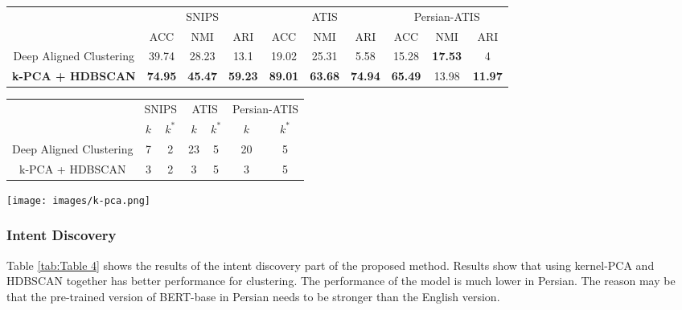 \documentclass{article}
\begin{document}
\begin{table*}
	\centering
	\caption{Results of evaluating the proposed method for Intent Discovery (clustering)}
	\label{tab:Table 4}
	\begin{tabular}{cccccccccc}
	  \toprule
	  & \multicolumn{3}{c}{SNIPS} & \multicolumn{3}{c}{ATIS} & \multicolumn{3}{c}{Persian-ATIS} \\
	  & ACC & NMI & ARI & ACC & NMI & ARI & ACC & NMI & ARI \\ \hline
	  \midrule
	  Deep Aligned Clustering & 39.74 & 28.23 & 13.1 & 19.02 & 25.31 & 5.58 & 15.28 & \textbf{17.53} & 4 \\ \hline
	  \textbf{k-PCA + HDBSCAN} & \textbf{74.95} & \textbf{45.47} & \textbf{59.23} & \textbf{89.01} & \textbf{63.68} & \textbf{74.94} & \textbf{65.49} & 13.98 & \textbf{11.97}\\ \hline
\end{tabular}
  \end{table*}
  \begin{table*}
	\centering
	\caption{The ability of methods to find different available intents in OOD utterances}
	\label{tab:Table 5}
	\begin{tabular}{ccccccc}
	  \toprule
	  & \multicolumn{2}{c}{SNIPS} & \multicolumn{2}{c}{ATIS} & \multicolumn{2}{c}{Persian-ATIS} \\
	  & $k$ & $k^*$ & $k$ & $k^*$ & $k$ & $k^*$ \\ \hline
	  \midrule
	  Deep Aligned Clustering & 7 & 2 & 23 & 5 & 20 & 5 \\ \hline
	  k-PCA + HDBSCAN & 3 & 2 & 3 & 5 & 3 & 5 \\ \hline
\end{tabular}
  \end{table*}
  \begin{figure*}[ht!]
	\centering
	\texttt{[image: images/k-pca.png]}
	\caption{Quality of representations of OOD utterances after applying kernel-PCA}
	\label{fig:Figure 4}
  \end{figure*}

\subsubsection{Intent Discovery}

Table \ref{tab:Table 4} shows the results of the intent discovery part of the proposed method. 
Results show that using kernel-PCA and HDBSCAN together has better performance for clustering. 
The performance of the model is much lower in Persian. The reason may be that the pre-trained version of BERT-base in Persian needs to be stronger than the English version.
\end{document}
